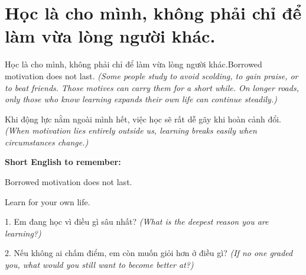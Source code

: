 \section{Học là cho mình, không phải chỉ để làm vừa lòng người khác.}
\begin{truyen}{Học là cho mình, không phải chỉ để làm vừa lòng người khác.}{Borrowed motivation does not last.}
\textit{(Some people study to avoid scolding, to gain praise, or to beat friends. Those motives can carry them for a short while. On longer roads, only those who know learning expands their own life can continue steadily.)}
\end{truyen}
\begin{baihoc}
Khi động lực nằm ngoài mình hết, việc học sẽ rất dễ gãy khi hoàn cảnh đổi.
\textit{(When motivation lies entirely outside us, learning breaks easily when circumstances change.)}
\end{baihoc}
\begin{ghinhoanh}
\textbf{Short English to remember:}

Borrowed motivation does not last.

Learn for your own life.
\end{ghinhoanh}
\begin{tuhocnhanh}
1. Em đang học vì điều gì sâu nhất? \textit{(What is the deepest reason you are learning?)}

2. Nếu không ai chấm điểm, em còn muốn giỏi hơn ở điều gì? \textit{(If no one graded you, what would you still want to become better at?)}
\end{tuhocnhanh}
\ngancach